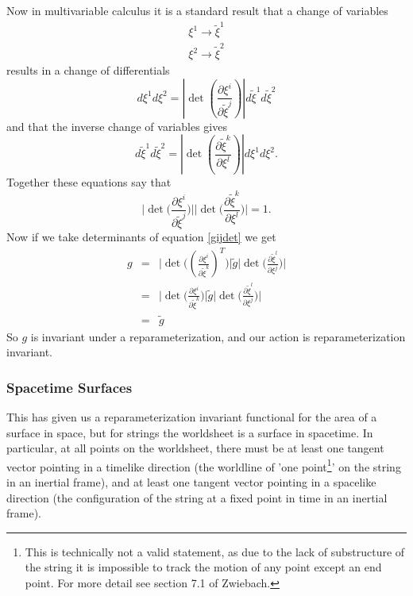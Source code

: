 \documentclass[a4paper,12pt]{article}
\numberwithin{equation}{section}
\begin{document}
Now in multivariable calculus it is a standard result that a change of variables 
\begin{eqnarray*}
\xi^1 \to \tilde{\xi}^1\\
\xi^2 \to \tilde{\xi}^2
\end{eqnarray*}
results in a change of differentials 
\begin{equation}
d\xi^1d\xi^2 = \left|\det\left(\frac{\partial\xi^i}{\partial\tilde{\xi}^j}\right)\right|d\tilde{\xi}^1d\tilde{\xi}^2
\end{equation}
and that the inverse change of variables gives
\begin{equation}
d\tilde{\xi}^1d\tilde{\xi}^2 = \left|\det\left(\frac{\partial\tilde{\xi}^k}{\partial\xi^l}\right)\right|d\xi^1d\xi^2.
\end{equation}
Together these equations say that
\begin{equation}
\Big|\det\Big(\frac{\partial\xi^i}{\partial\tilde{\xi}^j}\Big)\Big| \Big|\det\Big(\frac{\partial\tilde{\xi}^k}{\partial\xi^l}\Big)\Big|=1.
\end{equation}
Now if we take determinants of equation \ref{gijdet} we get
\begin{eqnarray}
g &=& \Big|\det\Big(\left(\frac{\partial\xi^i}{\partial\tilde{\xi}^k}\right)^T\Big)\Big| \tilde{g}\Big|\det\Big(\frac{\partial\tilde{\xi}^l}{\partial\xi^j}\Big)\Big|\\
&=& \Big|\det\Big(\frac{\partial\xi^i}{\partial\tilde{\xi}^k}\Big)\Big| \tilde{g}\Big|\det\Big(\frac{\partial\tilde{\xi}^l}{\partial\xi^j}\Big)\Big|\\
&=& \tilde{g}
\end{eqnarray}
So $g$ is invariant under a reparameterization, and our action is reparameterization invariant.
\subsubsection{Spacetime Surfaces}
This has given us a reparameterization invariant functional for the area of a surface in space, but for strings the worldsheet is a surface in spacetime. In particular, at all points on the worldsheet, there must be at least one tangent vector pointing in a timelike direction (the worldline of 'one point\footnote{This is technically not a valid statement, as due to the lack of substructure of the string it is impossible to track the motion of any point except an end point. For more detail see section 7.1 of Zwiebach. }' on the string in an inertial frame), and at least one tangent vector pointing in a spacelike direction (the configuration of the string at a fixed point in time in an inertial frame). 
\end{document}
